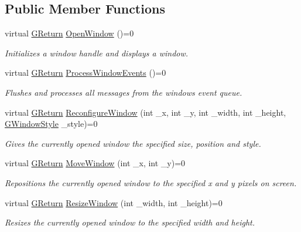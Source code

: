 \subsection*{Public Member Functions}
\begin{DoxyCompactItemize}
\item 
virtual \hyperlink{namespaceGW_a67a839e3df7ea8a5c5686613a7a3de21}{G\+Return} \hyperlink{classGW_1_1SYSTEM_1_1GWindow_a402b550212d77f19638ef1a1db9ad397}{Open\+Window} ()=0
\begin{DoxyCompactList}\small\item\em Initializes a window handle and displays a window. \end{DoxyCompactList}\item 
virtual \hyperlink{namespaceGW_a67a839e3df7ea8a5c5686613a7a3de21}{G\+Return} \hyperlink{classGW_1_1SYSTEM_1_1GWindow_a6c7db60db04436ac21cba3147f287e84}{Process\+Window\+Events} ()=0
\begin{DoxyCompactList}\small\item\em Flushes and processes all messages from the window\textquotesingle{}s event queue. \end{DoxyCompactList}\item 
virtual \hyperlink{namespaceGW_a67a839e3df7ea8a5c5686613a7a3de21}{G\+Return} \hyperlink{classGW_1_1SYSTEM_1_1GWindow_a113350a164370d30932a0476f00e4ea9}{Reconfigure\+Window} (int \+\_\+x, int \+\_\+y, int \+\_\+width, int \+\_\+height, \hyperlink{namespaceGW_1_1SYSTEM_ad117891e556631f842625c348d36a071}{G\+Window\+Style} \+\_\+style)=0
\begin{DoxyCompactList}\small\item\em Gives the currently opened window the specified size, position and style. \end{DoxyCompactList}\item 
virtual \hyperlink{namespaceGW_a67a839e3df7ea8a5c5686613a7a3de21}{G\+Return} \hyperlink{classGW_1_1SYSTEM_1_1GWindow_a9fc043b893f26c35e6ba965adcc17edb}{Move\+Window} (int \+\_\+x, int \+\_\+y)=0
\begin{DoxyCompactList}\small\item\em Repositions the currently opened window to the specified x and y pixels on screen. \end{DoxyCompactList}\item 
virtual \hyperlink{namespaceGW_a67a839e3df7ea8a5c5686613a7a3de21}{G\+Return} \hyperlink{classGW_1_1SYSTEM_1_1GWindow_a92633707248f32e4c166f27f03690d6d}{Resize\+Window} (int \+\_\+width, int \+\_\+height)=0
\begin{DoxyCompactList}\small\item\em Resizes the currently opened window to the specified width and height. \end{DoxyCompactList}\item 

\end{DoxyCompactItemize}
